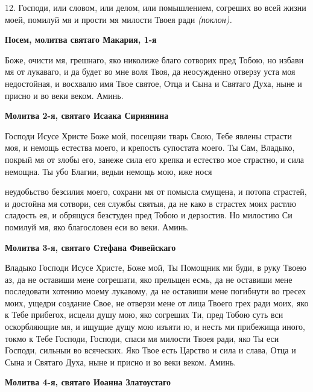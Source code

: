 12. Господи, или словом, или делом, или помышлением, согреших во
     всей жизни моей, помилуй мя и прости мя милости Твоея ради
     \itshape (поклон)\normalfont{}.
     


 

\bfseries Посем, молитва святаго Макария, 1-я\normalfont{}


   Боже, очисти мя, грешнаго, яко николиже благо сотворих пред
Тобою, но избави мя от лукаваго, и да будет во мне воля Твоя, да
неосужденно отверзу уста моя недостойная, и восхвалю имя Твое
святое, Отца и Сына и Святаго Духа, ныне и присно и во веки веком.
Аминь.



 

\bfseries Молитва 2-я, святаго Исаака Сириянина\normalfont{}


   Господи Исусе Христе Боже мой, посещаяи тварь Свою, Тебе явлены
страсти моя, и немощь естества моего, и крепость супостата моего. Ты Сам,
Владыко, покрый мя от злобы его, занеже сила его крепка и естество мое
страстно, и сила немощна. Ты убо Благии, ведыи немощь мою, иже нося

неудобьство безсилия моего, сохрани мя от помысла смущена, и потопа
страстей, и достойна мя сотвори, сея службы святыя, да не како в
страстех моих растлю сладость ея, и обрящуся безстуден пред Тобою и
дерзостив. Но милостию Си помилуй мя, яко благословен еси во веки.
Аминь.



 

\bfseries Молитва 3-я, святаго Стефана Фивейскаго\normalfont{}


   Владыко Господи Исусе Христе, Боже мой, Ты Помощник ми буди, в
руку Твоею аз, да не оставиши мене согрешати, яко прельщен есмь, да не
оставиши мене последовати хотению моему лукавому, да не оставиши
мене погибнути во гресех моих, ущедри создание Свое, не отверзи
мене от лица Твоего грех ради моих, яко к Тебе прибегох, исцели
душу мою, яко согреших Ти, пред Тобою суть вси оскорбляющие
мя, и ищущие дущу мою изъяти ю, и несть ми прибежища иного,
токмо к Тебе Господи, Господи, спаси мя милости Твоея ради, яко Ты
еси Господи, сильныи во всяческих. Яко Твое есть Царство и сила и
слава, Отца и Сына и Святаго Духа, ныне и присно и во веки веком.
Аминь.



 

\bfseries Молитва 4-я, святаго Иоанна Златоустаго\normalfont{}


